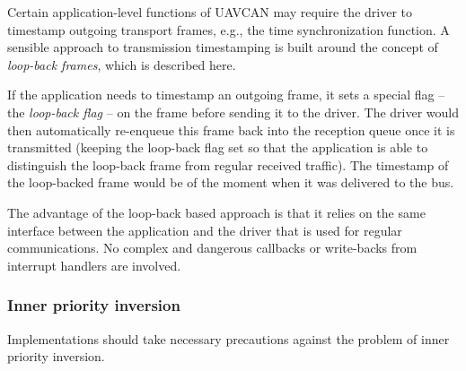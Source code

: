 \begin{remark}[breakable]
    Certain application-level functions of UAVCAN may require the driver to timestamp outgoing transport frames,
    e.g., the time synchronization function.
    A sensible approach to transmission timestamping is built around the concept of \emph{loop-back frames},
    which is described here.

    If the application needs to timestamp an outgoing frame, it sets a special flag -- the \emph{loop-back flag} --
    on the frame before sending it to the driver.
    The driver would then automatically re-enqueue this frame back into the reception queue once it is transmitted
    (keeping the loop-back flag set so that the application is able to distinguish the loop-back
    frame from regular received traffic).
    The timestamp of the loop-backed frame would be of the moment when it was delivered to the bus.

    The advantage of the loop-back based approach is that it relies on the same interface between
    the application and the driver that is used for regular communications.
    No complex and dangerous callbacks or write-backs from interrupt handlers are involved.
\end{remark}

\subsubsection{Inner priority inversion}

Implementations should take necessary precautions against the problem of inner priority inversion.

